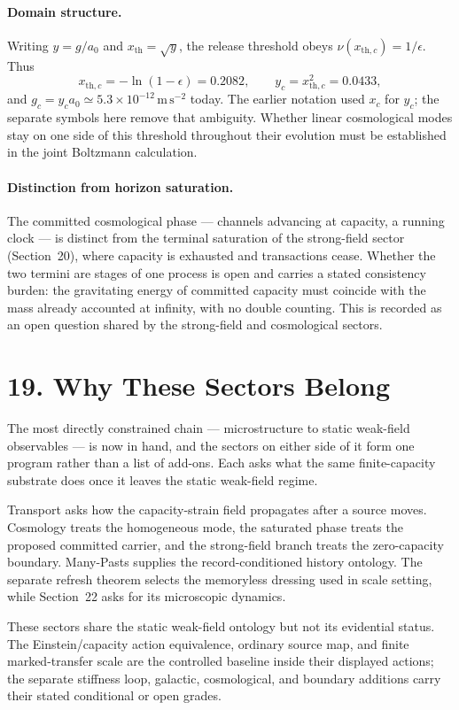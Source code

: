 \documentclass[11pt]{article}
\begin{document}
\paragraph{Domain structure.}
Writing $y=g/a_0$ and $x_{\mathrm{th}}=\sqrt y$, the release threshold obeys $\nu(x_{\mathrm{th},c})=1/\epsilon$. Thus
\[
x_{\mathrm{th},c}=-\ln(1-\epsilon)=0.2082,
\qquad
y_c=x_{\mathrm{th},c}^2=0.0433,
\]
and $g_c=y_ca_0\simeq5.3\times10^{-12}\,\mathrm{m\,s^{-2}}$ today. The earlier notation used $x_c$ for $y_c$; the separate symbols here remove that ambiguity. Whether linear cosmological modes stay on one side of this threshold throughout their evolution must be established in the joint Boltzmann calculation.

\paragraph{Distinction from horizon saturation.}
The committed cosmological phase --- channels advancing at capacity, a running clock --- is distinct from the terminal saturation of the strong-field sector (Section~20), where capacity is exhausted and transactions cease. Whether the two termini are stages of one process is open and carries a stated consistency burden: the gravitating energy of committed capacity must coincide with the mass already accounted at infinity, with no double counting. This is recorded as an open question shared by the strong-field and cosmological sectors.

\section{19. Why These Sectors Belong}

The most directly constrained chain --- microstructure to static weak-field observables --- is now in hand, and the sectors on either side of it form one program rather than a list of add-ons. Each asks what the same finite-capacity substrate does once it leaves the static weak-field regime.

Transport asks how the capacity-strain field propagates after a source moves. Cosmology treats the homogeneous mode, the saturated phase treats the proposed committed carrier, and the strong-field branch treats the zero-capacity boundary. Many-Pasts supplies the record-conditioned history ontology. The separate refresh theorem selects the memoryless dressing used in scale setting, while Section~22 asks for its microscopic dynamics.

These sectors share the static weak-field ontology but not its evidential status. The Einstein/capacity action equivalence, ordinary source map, and finite marked-transfer scale are the controlled baseline inside their displayed actions; the separate stiffness loop, galactic, cosmological, and boundary additions carry their stated conditional or open grades.
\end{document}
